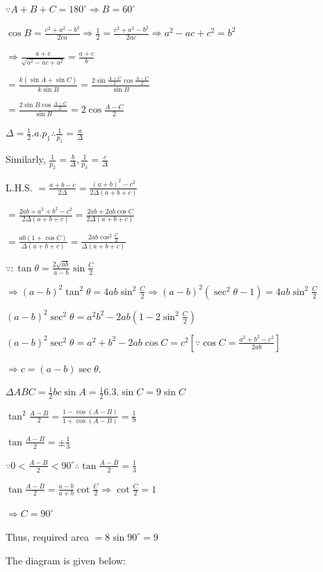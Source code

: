   $\because A + B + C = 180^\circ \Rightarrow B = 60^\circ$

  $\cos B = \frac{c^2 + a^2 - b^2}{2ca} \Rightarrow \frac{1}{2} = \frac{c^2 + a^2 - b^2}{2ac} \Rightarrow a^2 - ac + c^2 =
  b^2$

  $\Rightarrow \frac{a + c}{\sqrt{a^2 - ac + a^2}} = \frac{a + c}{b}$

  $= \frac{k(\sin A + \sin C)}{k\sin B} = \frac{2\sin\frac{A + C}{2}\cos\frac{A - C}{2}}{\sin B}$

  $= \frac{2\sin B\cos \frac{A - C}{2}}{\sin B} = 2\cos\frac{A - C}{2}$
\item $\Delta = \frac{1}{2}.a.p_1 \therefore \frac{1}{p_1} = \frac{a}{\Delta}$

  Similarly, $\frac{1}{p_2} = \frac{b}{\Delta}, \frac{1}{p_3} = \frac{c}{\Delta}$

  L.H.S. $= \frac{a + b - c}{2\Delta} = \frac{(a + b)^2 - c^2}{2\Delta(a + b + c)}$

  $= \frac{2ab + a^2 + b^2 - c^2}{2\Delta(a + b + c)} = \frac{2ab + 2ab\cos C}{2\Delta(a + b + c)}$

  $= \frac{ab(1 + \cos C)}{\Delta(a + b + c)} = \frac{2ab\cos^2\frac{C}{2}}{\Delta(a + b + c)}$
\item $\because :\tan\theta = \frac{2\sqrt{ab}}{a - b}\sin\frac{C}{2}$

  $\Rightarrow (a - b)^2\tan^2\theta = 4ab\sin^2\frac{C}{2} \Rightarrow (a - b)^2(\sec^2\theta - 1) = 4ab\sin^2\frac{C}{2}$

  $(a - b)^2\sec^2\theta = a^2b^2 -2ab\left(1 - 2\sin^2\frac{C}{2}\right)$

  $(a - b)^2\sec^2\theta = a^2 + b^2 - 2ab\cos C = c^2[\because \cos C = \frac{a^2 + b^2 - c^2}{2ab}]$

  $\Rightarrow c = (a - b)\sec\theta.$
\item $\Delta ABC = \frac{1}{2}bc\sin A = \frac{1}{2}6.3.\sin C = 9\sin C$

  $\tan^2\frac{A - B}{2} = \frac{1 - \cos(A - B)}{1 + \cos(A - B)} = \frac{1}{9}$

  $\tan\frac{A - B}{2} = \pm\frac{1}{3}$

  $\because 0 < \frac{A - B}{2} < 90^\circ \therefore \tan\frac{A - B}{2} = \frac{1}{3}$

  $\tan\frac{A - B}{2} = \frac{a - b}{a + b}\cot\frac{C}{2} \Rightarrow \cot\frac{C}{2} = 1$

  $\Rightarrow C = 90^\circ$

  Thus, required area $= 8\sin90^\circ = 9$
\item The diagram is given below:


